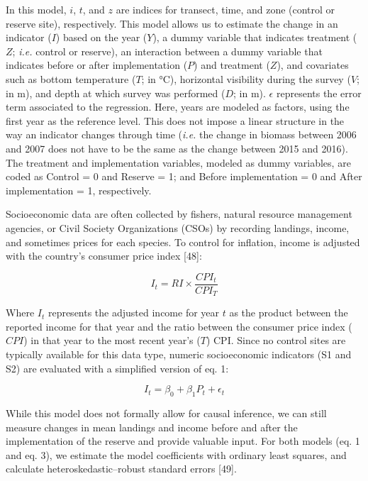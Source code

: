 \documentclass[12pt,]{article}
\begin{document}
In this model, \(i\), \(t\), and \(z\) are indices for transect, time,
and zone (control or reserve site), respectively. This model allows us
to estimate the change in an indicator (\(I\)) based on the year
(\(Y\)), a dummy variable that indicates treatment (\(Z\); \emph{i.e.}
control or reserve), an interaction between a dummy variable that
indicates before or after implementation (\(P\)) and treatment (\(Z\)),
and covariates such as bottom temperature (\(T\); in °C), horizontal
visibility during the survey (\(V\); in m), and depth at which survey
was performed (\(D\); in m). \(\epsilon\) represents the error term
associated to the regression. Here, years are modeled as factors, using
the first year as the reference level. This does not impose a linear
structure in the way an indicator changes through time (\emph{i.e.} the
change in biomass between 2006 and 2007 does not have to be the same as
the change between 2015 and 2016). The treatment and implementation
variables, modeled as dummy variables, are coded as Control = 0 and
Reserve = 1; and Before implementation = 0 and After implementation = 1,
respectively.

Socioeconomic data are often collected by fishers, natural resource
management agencies, or Civil Society Organizations (CSOs) by recording
landings, income, and sometimes prices for each species. To control for
inflation, income is adjusted with the country's consumer price index
{[}48{]}:

\begin{equation}I_t = RI\times \frac{CPI_t}{CPI_T}\end{equation}

Where \(I_t\) represents the adjusted income for year \(t\) as the
product between the reported income for that year and the ratio between
the consumer price index (\(CPI\)) in that year to the most recent
year's (\(T\)) CPI. Since no control sites are typically available for
this data type, numeric socioeconomic indicators (S1 and S2) are
evaluated with a simplified version of eq. 1:

\begin{equation}I_{t}=\beta_0 + \beta_1P_{t} + \epsilon_{t}\end{equation}

While this model does not formally allow for causal inference, we can
still measure changes in mean landings and income before and after the
implementation of the reserve and provide valuable input. For both
models (eq. 1 and eq. 3), we estimate the model coefficients with
ordinary least squares, and calculate heteroskedastic--robust standard
errors {[}49{]}.
\end{document}
